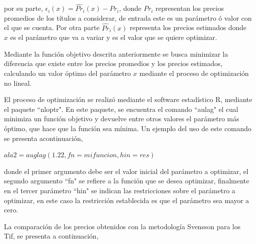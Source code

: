 \noindent por su parte, $\epsilon_{i}(x)= \hat{Pr}_{i}(x)-Pr_{i}$, donde $Pr_{i}$ representan los precios promedios de los t\'itulos a considerar, de entrada este es un par\'ametro \'o valor con el que se cuenta. Por otra parte $\hat{Pr}_{i}(x)$ representa los precios estimados donde $x$ es el par\'ametro que va a variar y es el valor que se quiere optimizar.

\vspace{0.5cm}

\hspace{0.4cm} Mediante la funci\'on objetivo descrita anteriormente se busca minimizar la diferencia que existe entre los precios promedios y los precios estimados, calculando un valor \'optimo del par\'ametro $x$ mediante el proceso de optimizaci\'on no lineal.

\vspace{0.5cm}

\hspace{0.4cm}El proceso de optimizaci\'on se realiz\'o mediante el software estad\'istico R, mediante el paquete ``nloptr". En este paquete, se encuentra el comando ``aulag" el cual minimiza un funci\'on objetivo y devuelve entre otros valores el par\'ametro m\'as \'optimo, que hace que la funci\'on sea m\'inima. Un ejemplo del uso de este comando se presenta acontinuaci\'on,

\vspace{0.5cm}
\begin{center}
  $ala2=auglag(1.22, fn=mifuncion, hin=res)$
\end{center}

\vspace{0.5cm}

\noindent donde el primer argumento debe ser el valor inicial del par\'ametro a optimizar, el segundo argumento ``fn" se refiere a la funci\'on que se desea optimizar, finalmente en el tercer par\'ametro ``hin" se indican las restricciones sobre el par\'ametro a optimizar, en este caso la restricci\'on establecida es que el par\'ametro sea mayor a cero.

\hspace{0.4cm} La comparaci\'on de los precios obtenidos con la metodolog\'ia Svensson para los Tif, se presenta a continuaci\'on,

